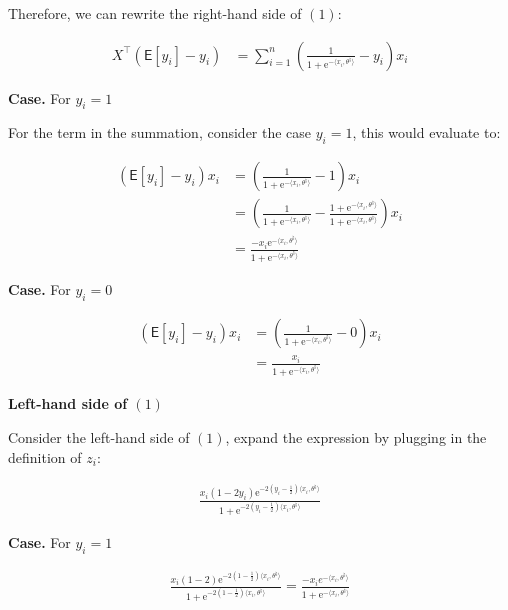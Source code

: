 \documentclass{article}
\begin{document}
Therefore, we can rewrite the right-hand side of $(1)$:

\begin{align*}
    X^\intercal (\mathsf{E} [ y_i ] - y_i)
    &= \sum_{i = 1}^n \left( \frac{1}{1 + \mathrm{e}^{-\langle x_i, \theta^{\natural} \rangle}} - y_i \right) x_i
\end{align*}

\textbf{Case.} For \( y_i = 1 \)
\bigskip

For the term in the summation, consider the case $y_i = 1$, this would evaluate to:

\begin{align*}
    (\mathsf{E} [ y_i ] - y_i ) x_i
    &= \left( \frac{1}{1 + \mathrm{e}^{-\langle x_i, \theta^{\natural} \rangle}} - 1 \right) x_i \\
    &= \left( \frac{1}{1 + \mathrm{e}^{-\langle x_i, \theta^{\natural} \rangle}} - \frac{1 + \mathrm{e}^{-\langle x_i, \theta^{\natural} \rangle}}{1 + \mathrm{e}^{-\langle x_i, \theta^{\natural} \rangle}} \right) x_i \\
    &= \frac{- x_i \mathrm{e}^{-\langle x_i, \theta^{\natural} \rangle}}{1 + \mathrm{e}^{-\langle x_i, \theta^{\natural} \rangle}} 
\end{align*}


\textbf{Case.} For \( y_i = 0 \)

\begin{align*}
    (\mathsf{E} [ y_i ] - y_i ) x_i
    &= \left( \frac{1}{1 + \mathrm{e}^{-\langle x_i, \theta^{\natural} \rangle}} - 0 \right) x_i \\
    &= \frac{x_i}{1 + \mathrm{e}^{-\langle x_i, \theta^{\natural} \rangle}}
\end{align*}

\bigskip

\begin{center}
    \textbf{Left-hand side of $(1)$}
\end{center}

Consider the left-hand side of $(1)$, expand the expression by plugging in the definition of $z_i$:

\begin{align*}
    \frac{x_i (1 - 2y_i)\mathrm{e}^{-2(y_i - \frac{1}{2})\langle x_i, \theta^{\natural} \rangle}}{1 + \mathrm{e}^{-2(y_i - \frac{1}{2})\langle x_i, \theta^{\natural} \rangle}}
\end{align*}

\textbf{Case.} For \( y_i = 1 \)

\begin{align*}
    \frac{x_i (1 - 2)\mathrm{e}^{-2(1 - \frac{1}{2})\langle x_i, \theta^{\natural} \rangle}}{1 + \mathrm{e}^{-2(1 - \frac{1}{2})\langle x_i, \theta^{\natural} \rangle}}
    = \frac{- x_i e^{-\langle x_i, \theta^{\natural} \rangle}}{1 + \mathrm{e}^{-\langle x_i, \theta^{\natural} \rangle}} 
\end{align*}
\end{document}
